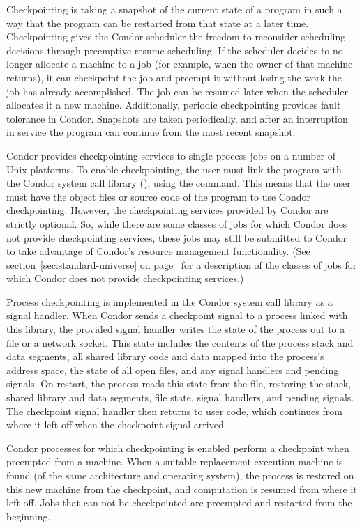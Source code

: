 Checkpointing is taking a snapshot of the current state of a program
in such a way that the program can be restarted from that state at a
later time.  Checkpointing gives the Condor scheduler the freedom to
reconsider scheduling decisions through preemptive-resume scheduling.
If the scheduler decides to no longer allocate a machine to a job (for
example, when the owner of that machine returns), it can checkpoint
the job and preempt it without losing the work the job has already
accomplished.  The job can be resumed later when the scheduler
allocates it a new machine.  Additionally, periodic checkpointing
provides fault tolerance in Condor.  Snapshots are taken periodically,
and after an interruption in service the program can continue from the
most recent snapshot.

Condor provides checkpointing services to single process jobs on a
number of Unix platforms.
To enable checkpointing, the user must link the program with the
Condor system call library (), using the
 command.
This means that the
user must have the object files or source code of the program to use
Condor checkpointing.  However, the checkpointing services provided by
Condor are strictly optional.  So, while there are some classes of
jobs for which Condor does not provide checkpointing services, these
jobs may still be submitted to Condor to take advantage of Condor's
resource management functionality.  (See
section~\ref{sec:standard-universe} on
page~\pageref{sec:standard-universe} for a description of the
classes of jobs for which Condor does not provide checkpointing
services.)

Process checkpointing is implemented in the Condor system call library
as a signal handler.  When Condor sends a checkpoint signal to a
process linked with this library, the provided signal handler writes
the state of the process out to a file or a network socket.  This
state includes the contents of the process stack and data segments,
all shared library code and data mapped into the process's address
space, the state of all open files, and any signal handlers and
pending signals.  On restart, the process reads this state from the
file, restoring the stack, shared library and data segments, file
state, signal handlers, and pending signals.  The checkpoint signal
handler then returns to user code, which continues from where it left
off when the checkpoint signal arrived.

Condor processes for which checkpointing is enabled perform a
checkpoint when preempted from a machine.  When a suitable replacement
execution machine is found (of the same architecture and operating
system), the process is restored on this new machine from the
checkpoint, and computation is resumed from where it left off.  Jobs
that can not be checkpointed are preempted and restarted from the
beginning.

